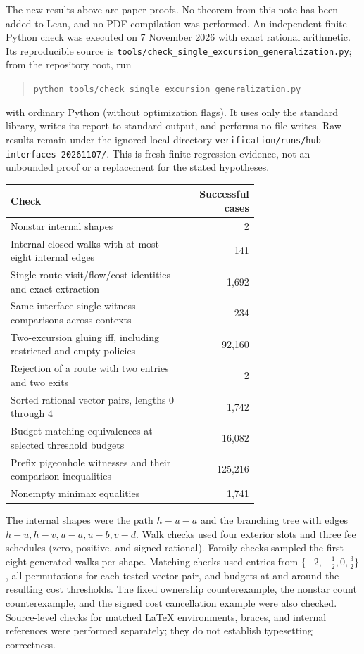 \documentclass[11pt]{article}
\theoremstyle{remark}
\newcommand{\code}[1]{\nolinkurl{#1}}
\begin{document}
The new results above are paper proofs. No theorem from this note has been
added to Lean, and no PDF compilation was performed. An independent finite
Python check was executed on 7 November 2026 with exact rational arithmetic.
Its reproducible source is
\code{tools/check_single_excursion_generalization.py}; from the repository
root, run
\begin{quote}
\code{python tools/check_single_excursion_generalization.py}
\end{quote}
with ordinary Python (without optimization flags). It uses only the standard
library, writes its report to standard output, and performs no file writes.
Raw results remain under the ignored local directory
\code{verification/runs/hub-interfaces-20261107/}. This is fresh finite
regression evidence, not an unbounded proof or a replacement for the stated
hypotheses.
\begin{center}
\begin{tabular}{@{}p{0.70\linewidth}r@{}}
\toprule
Check & Successful cases \\
\midrule
Nonstar internal shapes & 2 \\
Internal closed walks with at most eight internal edges & 141 \\
Single-route visit/flow/cost identities and exact extraction & 1,692 \\
Same-interface single-witness comparisons across contexts & 234 \\
Two-excursion gluing iff, including restricted and empty policies & 92,160 \\
Rejection of a route with two entries and two exits & 2 \\
Sorted rational vector pairs, lengths $0$ through $4$ & 1,742 \\
Budget-matching equivalences at selected threshold budgets & 16,082 \\
Prefix pigeonhole witnesses and their comparison inequalities & 125,216 \\
Nonempty minimax equalities & 1,741 \\
\bottomrule
\end{tabular}
\end{center}
The internal shapes were the path $h-u-a$ and the branching tree with edges
$h-u,h-v,u-a,u-b,v-d$. Walk checks used four exterior slots and three fee
schedules (zero, positive, and signed rational). Family checks sampled the
first eight generated walks per shape. Matching checks used entries from
$\{-2,-\tfrac12,0,\tfrac32\}$, all permutations for each tested vector
pair, and budgets at and around the resulting cost thresholds. The fixed
ownership counterexample, the nonstar count counterexample, and the signed
cost cancellation example were also checked. Source-level checks for matched
LaTeX environments, braces, and internal references were performed separately;
they do not establish typesetting correctness.
\end{document}
